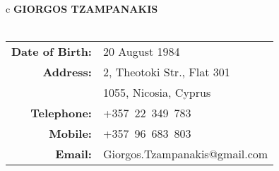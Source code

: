 \documentclass [a4paper,11pt]{article}
\begin{document}
	\begin {center}
		\begin {tabular} {c}
			\textbf {\Large {GIORGOS TZAMPANAKIS}} \\
			\\
				\begin {tabular} {rl}
					\textbf {Date of Birth:} & 20 August 1984 \\
					\textbf {Address:} & 2, Theotoki Str., Flat 301 \\
							& 1055, Nicosia, Cyprus \\
					\textbf {Telephone:} & +357~22~349~783 \\
					\textbf {Mobile:} & +357~96~683~803 \\
					\textbf {Email:} & Giorgos.Tzampanakis@gmail.com \\
				\end {tabular} \\
		\end {tabular}
	\end {center}

	\medskip
\end{document}
